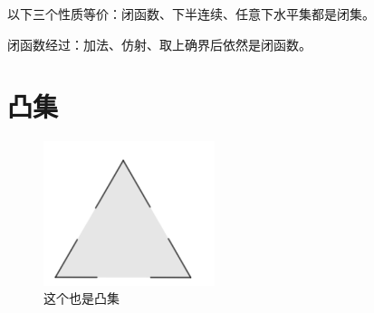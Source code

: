 \documentclass{article}
\begin{document}
\begin{figure}[h]
    \centering
\end{figure}
以下三个性质等价：闭函数、下半连续、任意下水平集都是闭集。

闭函数经过：加法、仿射、取上确界后依然是闭函数。
\section{凸集}
\begin{figure}[h]
    \centering
    \includegraphics[width=5cm]{6.png}
    \caption{这个也是凸集}
\end{figure}
\end{document}
